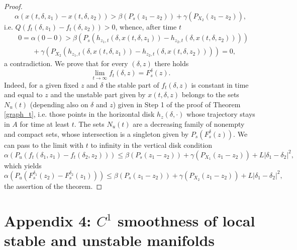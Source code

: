 \documentclass[11pt, leqno]{amsart}
\theoremstyle{definition}
\begin{document}
\begin{proof}
	$$\alpha(x(t,\delta,z_1)-x(t,\delta,z_2)) >  \beta(P_s(z_1-z_2)) + \gamma(P_{X_2}(z_1-z_2)),
	$$
	i.e. $Q(f_t(\delta,z_1)-f_t(\delta,z_2))>0$, whence, after time $t$
	\begin{align*}
		& 0 = \alpha(0-0) >  \beta(P_{s}(h_{z_1,t}(\delta,x(t,\delta,z_1))-h_{z_2,t}(\delta,x(t,\delta,z_2)))) \\
		& \qquad + \gamma(P_{X_2}(h_{z_1,t}(\delta,x(t,\delta,z_1))-h_{z_2,t}(\delta,x(t,\delta,z_2)))) = 0,
	\end{align*}
	a contradiction. We prove that for every $(\delta,z)$ there holds
	$$
	\lim_{t\to \infty} f_t(\delta,z) = F_s^\delta(z).
	$$
	Indeed, for a given fixed $z$ and $\delta$ the stable part of $f_t(\delta,z)$ is constant in time and equal to $z$ and the unstable part given by $x(t,\delta,z)$ belongs to the sets $N_u(t)$ (depending also on $\delta$ and $z$) given in Step 1 of the proof of Theorem \ref{graph_t}, i.e. those points in the horizontal disk $h_z(\delta,\cdot)$ whose trajectory stays in $A$ for time at least $t$. The sets $N_u(t)$ are a decreasing family of nonempty and compact sets, whose intersection is a singleton given by $P_s(F_s^\delta(z))$. We can pass to the limit with $t$ to infinity in the vertical disk condition
	$$\alpha(P_u(f_t(\delta_1,z_1)-f_t(\delta_2,z_2))) \leq  \beta(P_s(z_1-z_2)) + \gamma(P_{X_1}(z_1-z_2)) + L |\delta_1-\delta_2|^2,
	$$
	which yields
	$$\alpha(P_u(F^{\delta_1}_s(z_2) - F^{\delta_2}_s(z_1))) \leq  \beta(P_s(z_1-z_2)) + \gamma(P_{X_2}(z_1-z_2)) + L |\delta_1-\delta_2|^2,
	$$
	the assertion of the theorem.
\end{proof}


\section{Appendix 4: $C^1$ smoothness of local stable and unstable manifolds}
\end{document}
